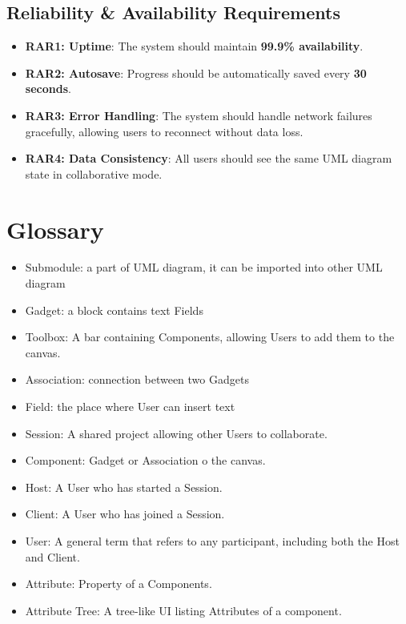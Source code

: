 \documentclass[12pt]{article}
\begin{document}
\subsection{Reliability \& Availability Requirements}
\begin{itemize}
    \item \textbf{RAR1: Uptime}: The system should maintain \textbf{99.9\% availability}.
    \item \textbf{RAR2: Autosave}: Progress should be automatically saved every \textbf{30 seconds}.
    \item \textbf{RAR3: Error Handling}: The system should handle network failures gracefully, allowing users to reconnect without data loss.
    \item \textbf{RAR4: Data Consistency}: All users should see the same UML diagram state in collaborative mode.
\end{itemize}


\section{Glossary}
    \begin{itemize}
        \item Submodule: a part of UML diagram, it can be imported into other UML diagram
        \item Gadget: a block contains text Fields
        \item Toolbox: A bar containing  Components, allowing Users to add them to the canvas.
        \item Association: connection between two Gadgets
        \item Field: the place where User can insert text
        \item Session: A shared project allowing other Users to collaborate.
        \item Component: Gadget or Association o the canvas.
        \item Host: A User who has started a Session.
        \item Client: A User who has joined a Session.
        \item User: A general term that refers to any participant, including both the Host and Client.
        \item Attribute: Property of a Components.
        \item Attribute Tree: A tree-like UI listing Attributes of a component.
    \end{itemize}
\end{document}
